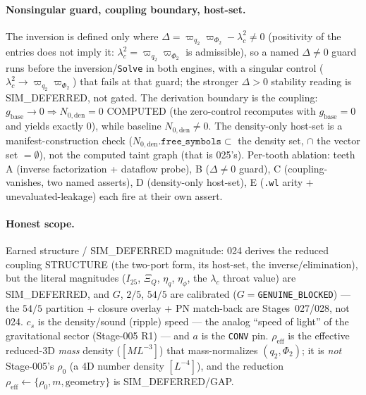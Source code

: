 \paragraph{Nonsingular guard, coupling boundary, host-set.}
The inversion is defined only where \(\Delta=\varpi_{q_2}\varpi_{\Phi_2}-\lambda_c^2\ne0\)
(positivity of the entries does not imply it: \(\lambda_c^2=\varpi_{q_2}\varpi_{\Phi_2}\) is
admissible), so a named \(\Delta\ne0\) guard runs before the inversion/\texttt{Solve} in both
engines, with a singular control (\(\lambda_c^2\to\varpi_{q_2}\varpi_{\Phi_2}\)) that fails at that
guard; the stronger \(\Delta>0\) stability reading is SIM\_DEFERRED, not gated. The derivation
boundary is the coupling: \(g_{\mathrm{base}}\to0\Rightarrow N_{0,\mathrm{den}}=0\) COMPUTED (the
zero-control recomputes with \(g_{\mathrm{base}}=0\) and yields exactly \(0\)), while baseline
\(N_{0,\mathrm{den}}\ne0\). The density-only host-set is a manifest-construction check
(\(N_{0,\mathrm{den}}.\texttt{free\_symbols}\subset\) the density set, \(\cap\) the vector set
\(=\emptyset\)), not the computed taint graph (that is 025's). Per-tooth ablation: teeth A (inverse
factorization + dataflow probe), B (\(\Delta\ne0\) guard), C (coupling-vanishes, two named asserts),
D (density-only host-set), E (\texttt{.wl} arity + unevaluated-leakage) each fire at their own assert.

\paragraph{Honest scope.}
Earned structure / SIM\_DEFERRED magnitude: 024 derives the reduced coupling STRUCTURE (the
two-port form, its host-set, the inverse/elimination), but the literal magnitudes (\(I_{25}\),
\(\Xi_Q\), \(\eta_q\), \(\eta_\phi\), the \(\lambda_c\) throat value) are SIM\_DEFERRED, and \(G\),
\(2/5\), \(54/5\) are calibrated (\(G=\)\texttt{GENUINE\_BLOCKED}) --- the \(54/5\) partition +
closure overlay + PN match-back are Stages~027/028, not 024. \(c_s\) is the density/sound (ripple)
speed --- the analog ``speed of light'' of the gravitational sector (Stage-005 R1) --- and \(a\) is
the \texttt{CONV} pin. \(\rho_{\mathrm{eff}}\) is the effective reduced-3D \emph{mass} density
(\([M L^{-3}]\)) that mass-normalizes \((q_2,\Phi_2)\); it is \emph{not} Stage-005's \(\rho_0\) (a 4D
number density \([L^{-4}]\)), and the reduction \(\rho_{\mathrm{eff}}\leftarrow\{\rho_0,m,\text{geometry}\}\)
is SIM\_DEFERRED/GAP.

